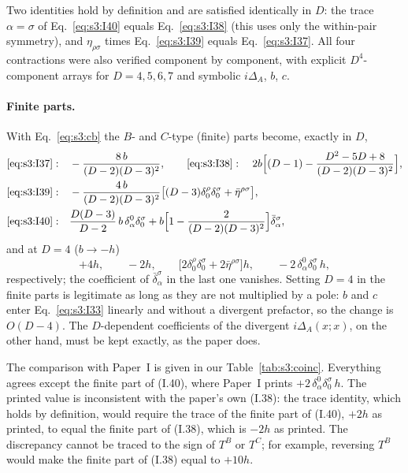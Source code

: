 \documentclass[aps,prd,onecolumn,10pt,nofootinbib,floatfix]{revtex4-2}
\newcommand{\PI}{Paper~I}
\newcommand{\eqI}[1]{(I.#1)}
\begin{document}
Two identities hold by definition and are satisfied identically in $D$: the trace
$\alpha=\sigma$ of Eq.~\eqref{eq:s3:I40} equals Eq.~\eqref{eq:s3:I38} (this uses only the
within-pair symmetry), and $\eta_{\rho\sigma}$ times Eq.~\eqref{eq:s3:I39} equals
Eq.~\eqref{eq:s3:I37}. All four contractions were also verified component by component, with
explicit $D^4$-component arrays for $D=4,5,6,7$ and symbolic $i\Delta_A$, $b$, $c$.

\paragraph*{Finite parts.}
With Eq.~\eqref{eq:s3:cb} the $B$- and $C$-type (finite) parts become, exactly in $D$,
\begin{equation}\label{eq:s3:finiteD}
\begin{aligned}
\text{\eqref{eq:s3:I37}}:&\quad -\frac{8\,b}{(D-2)(D-3)^2},\qquad
\text{\eqref{eq:s3:I38}}:\quad 2b\Bigl[(D-1)-\frac{D^2-5D+8}{(D-2)(D-3)^2}\Bigr],\\
\text{\eqref{eq:s3:I39}}:&\quad -\frac{4\,b}{(D-2)(D-3)^2}\bigl[(D-3)\delta^\rho_0\delta^\sigma_0
+\bar\eta^{\rho\sigma}\bigr],\\
\text{\eqref{eq:s3:I40}}:&\quad \frac{D(D-3)}{D-2}\,b\,\delta^0_\alpha\delta^\sigma_0
+b\Bigl[1-\frac{2}{(D-2)(D-3)^2}\Bigr]\bar\delta^\sigma_\alpha ,
\end{aligned}
\end{equation}
and at $D=4$ ($b\to-h$)
\begin{equation}\label{eq:s3:finite4}
+4h,\qquad -2h,\qquad \bigl[2\delta^\rho_0\delta^\sigma_0+2\bar\eta^{\rho\sigma}\bigr]h,\qquad
-2\,\delta^0_\alpha\delta^\sigma_0\,h ,
\end{equation}
respectively; the coefficient of $\bar\delta^\sigma_\alpha$ in the last one vanishes. Setting
$D=4$ in the finite parts is legitimate as long as they are not multiplied by a pole: $b$ and
$c$ enter Eq.~\eqref{eq:s3:I33} linearly and without a divergent prefactor, so the change is
$O(D-4)$. The $D$-dependent coefficients of the divergent $i\Delta_A(x;x)$, on the other hand,
must be kept exactly, as the paper does.

The comparison with \PI{} is given in our Table~\ref{tab:s3:coinc}. Everything agrees except the
finite part of \eqI{40}, where \PI{} prints $+2\,\delta^0_\alpha\delta^\sigma_0\,h$. The printed
value is inconsistent with the paper's own \eqI{38}: the trace identity, which holds by
definition, would require the trace of the finite part of \eqI{40}, $+2h$ as printed, to equal
the finite part of \eqI{38}, which is $-2h$ as printed. The discrepancy cannot be traced to the
sign of $T^B$ or $T^C$; for example, reversing $T^B$ would make the finite part of \eqI{38}
equal to $+10h$.
\end{document}
